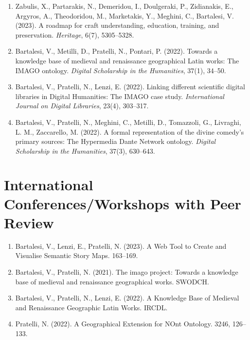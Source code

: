 \begin{enumerate}[
    leftmargin=*,
    label={J\arabic*.},
    ref={J\arabic*.}]
    \item Zabulis, X., Partarakis, N., Demeridou, I., Doulgeraki, P., Zidianakis, E., Argyros, A., Theodoridou, M., Marketakis, Y., Meghini, C., Bartalesi, V. (2023). A roadmap for craft understanding, education, training, and preservation. \emph{Heritage}, 6(7), 5305–5328.
    \item Bartalesi, V., Metilli, D., Pratelli, N.,  Pontari, P. (2022). Towards a knowledge base of medieval and renaissance geographical Latin works: The IMAGO ontology. \emph{Digital Scholarship in the Humanities}, 37(1), 34–50.
    \item Bartalesi, V., Pratelli, N., Lenzi, E. (2022). Linking different scientific digital libraries in Digital Humanities: The IMAGO case study. \emph{International Journal on Digital Libraries}, 23(4), 303–317.
    \item Bartalesi, V., Pratelli, N., Meghini, C., Metilli, D., Tomazzoli, G., Livraghi, L. M., Zaccarello, M. (2022). A formal representation of the divine comedy’s primary sources: The Hypermedia Dante Network ontology. \emph{Digital Scholarship in the Humanities}, 37(3), 630–643.
\end{enumerate}

\section*{International Conferences/Workshops with Peer Review}
\begin{enumerate}[
    leftmargin=*,
    label={C\arabic*.},
    ref={C\arabic*.}]
    
    \item Bartalesi, V., Lenzi, E., Pratelli, N. (2023). A Web Tool to Create and Visualise Semantic Story Maps. 163–169.
    \item Bartalesi, V., Pratelli, N. (2021). The imago project: Towards a knowledge base of medieval and renaissance geographical works. SWODCH.
    \item Bartalesi, V., Pratelli, N., Lenzi, E. (2022). A Knowledge Base of Medieval and Renaissance Geographic Latin Works. IRCDL.
    \item Pratelli, N. (2022). A Geographical Extension for NOnt Ontology. 3246, 126–133.
\end{enumerate}

